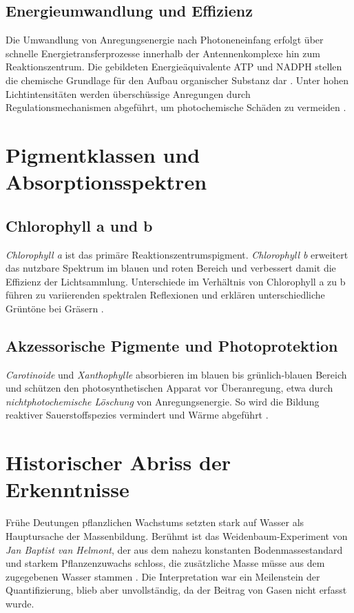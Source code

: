 \subsection{Energieumwandlung und Effizienz}
Die Umwandlung von Anregungsenergie nach Photoneneinfang erfolgt über schnelle Energietransferprozesse innerhalb der Antennenkomplexe hin zum Reaktionszentrum. Die gebildeten Energieäquivalente ATP und NADPH stellen die chemische Grundlage für den Aufbau organischer Substanz dar \parencite{zhao2012chlorophyll}. Unter hohen Lichtintensitäten werden überschüssige Anregungen durch Regulationsmechanismen abgeführt, um photochemische Schäden zu vermeiden \parencite{gao2010lightabsorption}.

\section{Pigmentklassen und Absorptionsspektren}

\subsection{Chlorophyll a und b}
\textit{Chlorophyll a} ist das primäre Reaktionszentrumspigment. \textit{Chlorophyll b} erweitert das nutzbare Spektrum im blauen und roten Bereich und verbessert damit die Effizienz der Lichtsammlung. Unterschiede im Verhältnis von Chlorophyll a zu b führen zu variierenden spektralen Reflexionen und erklären unterschiedliche Grüntöne bei Gräsern \parencite{schmidt2015chlorophyll}.

\subsection{Akzessorische Pigmente und Photoprotektion}
\textit{Carotinoide} und \textit{Xanthophylle} absorbieren im blauen bis grünlich-blauen Bereich und schützen den photosynthetischen Apparat vor Überanregung, etwa durch \textit{nichtphotochemische Löschung} von Anregungsenergie. So wird die Bildung reaktiver Sauerstoffspezies vermindert und Wärme abgeführt \parencite{gao2010lightabsorption}.


\section{Historischer Abriss der Erkenntnisse}

Frühe Deutungen pflanzlichen Wachstums setzten stark auf Wasser als Hauptursache der Massenbildung. Berühmt ist das Weidenbaum-Experiment von \textit{Jan Baptist van Helmont}, der aus dem nahezu konstanten Bodenmassestandard und starkem Pflanzenzuwachs schloss, die zusätzliche Masse müsse aus dem zugegebenen Wasser stammen \parencite{vanhelmont1648}. Die Interpretation war ein Meilenstein der Quantifizierung, blieb aber unvollständig, da der Beitrag von Gasen nicht erfasst wurde.

